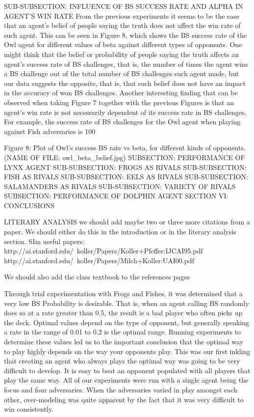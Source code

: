 \documentclass[a4paper,12pt]{article}
\begin{document}
 SUB-SUBSECTION: INFLUENCE OF BS SUCCESS RATE AND ALPHA IN AGENT’S WIN RATE
From the previous experiments it seems to be the case that an agent’s belief of people saying the truth does not affect the win rate of such agent. This can be seen in Figure 8, which shows the BS success rate of the Owl agent for different values of beta against different types of opponents. One might think that the belief or probability of people saying the truth affects an agent’s  success rate of BS challenges, that is, the number of times the agent wins a BS challenge out of the total number of BS challenges such agent made, but our data suggests the opposite, that is, that such belief does not have an impact in the accuracy of won BS challenges. Another interesting finding that can be observed when taking Figure 7 together with the previous Figures is that an agent’s win rate is not necessarily dependent of its success rate in BS challenges. For example, the success rate of BS challenges for the Owl agent when playing against Fish adversaries is 100%


Figure 8: Plot of Owl’s success BS rate vs beta, for different kinds of opponents. (NAME OF FILE: owl_beta_belief.jpg)
SUBSECTION: PERFORMANCE OF LYNX AGENT
SUB-SUBSECTION: FROGS AS RIVALS
SUB-SUBSECTION: FISH AS RIVALS
SUB-SUBSECTION: EELS AS RIVALS
SUB-SUBSECTION: SALAMANDERS AS RIVALS
SUB-SUBSECTION: VARIETY OF RIVALS
SUBSECTION: PERFORMANCE OF DOLPHIN AGENT
SECTION VI: CONCLUSIONS

LITERARY ANALYSIS
we should add maybe two or three more citations from a paper. We should either do this in the introduction or in the literary analysis section. SIm useful papers:
http://ai.stanford.edu/~koller/Papers/Koller+Pfeffer:IJCAI95.pdf 
http://ai.stanford.edu/~koller/Papers/Milch+Koller:UAI00.pdf 

We should also add the class textbook to the references pages




Through trial experimentation with Frogs and Fishes, it was determined that a very low BS Probability is desirable. That is, when an agent calling BS randomly does so at a rate greater than 0.5, the result is a bad player who often picks up the deck. Optimal values depend on the type of opponent, but generally speaking a rate in the range of 0.01 to 0.2 is the optimal range. Running experiments to determine these values led us to the important conclusion that the optimal way to play highly depends on the way your opponents play. This was our first inkling that creating an agent who always plays the optimal way was going to be very difficult to develop. It is easy to beat an opponent populated with all players that play the same way. All of our experiments were run with a single agent being the focus and four adversaries. When the adversaries varied in play amongst each other, over-modeling was quite apparent by the fact that it was very difficult to win consistently.













	
\end{document}
